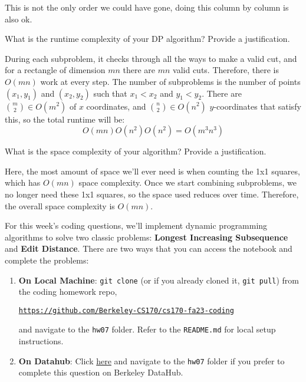 \documentclass[11pt]{article}
\begin{document}
\begin{subparts}
\begin{solution}
		This is not the only order we could have gone, doing this column by column is also ok. 
	\end{solution}
\subpart What is the runtime complexity of your DP algorithm? Provide a justification.

	\begin{solution}
		During each subproblem, it checks through all the ways to make a valid cut, and for a rectangle of 
		dimension $mn$ there are $mn$ valid cuts. Therefore, there is $O(mn)$ work at every step. The number 
		of subproblems is the number of points $(x_1, y_1)$ and $(x_2, y_2)$ such that $x_1 < x_2$ and 
		$y_1 < y_2$. There are ${m \choose 2} \in O(m^2)$ of $x$ coordinates, and ${n \choose 2} \in O(n^2)$ $y$-coordinates that 
		satisfy this, so the total runtime will be: 
		\[
			O(mn) O(n^2) O(n^2) = O(m^3n^3)
		\]
	\end{solution}

\subpart What is the space complexity of your algorithm? Provide a justification.

	\begin{solution}
		Here, the most amount of space we'll ever need is when counting the 1x1 squares, which has $O(mn)$ space 
		complexity. Once we start combining subproblems, we no longer need these 1x1 squares, so the space 
		used reduces over time. Therefore, the overall space complexity is $O(mn)$.
	\end{solution}

\end{subparts}
\pagebreak


For this week’s coding questions, we'll implement dynamic programming algorithms to solve two classic problems: \textbf{Longest Increasing Subsequence} and \textbf{Edit Distance}.  There are two ways that you can access the notebook and complete the problems:
\begin{enumerate}
    \item \textbf{On Local Machine}: \texttt{git clone} (or if you already cloned it, \texttt{git pull}) from the coding homework repo, 
    
    \textcolor{blue}{\href{https://github.com/Berkeley-CS170/cs170-fa23-coding}{\texttt{https://github.com/Berkeley-CS170/cs170-fa23-coding}}}
    
    and navigate to the \texttt{hw07} folder. Refer to the \texttt{README.md} for local setup instructions.

    \item \textbf{On Datahub}: Click \textcolor{blue}{\href{https://datahub.berkeley.edu/hub/user-redirect/git-pull?repo=https://github.com/Berkeley-CS170/cs170-fa23-coding}{here}} and navigate to the \texttt{hw07} folder if you prefer to complete this question on Berkeley DataHub.
\end{enumerate}
\end{document}
